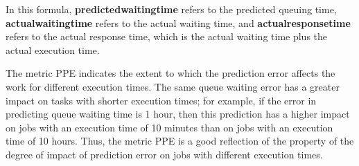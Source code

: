 \documentclass[conference,compsoc]{IEEEtran}
\begin{document}
In this formula, \textbf{predictedwaitingtime} refers to the predicted queuing time, \textbf{actualwaitingtime} refers to the actual waiting time, and \textbf{actualresponsetime} refers to the actual response time, which is the actual waiting time plus the actual execution time.

The metric PPE indicates the extent to which the prediction error affects the work for different execution times. The same queue waiting error has a greater impact on tasks with shorter execution times; for example, if the error in predicting queue waiting time is 1 hour, then this prediction has a higher impact on jobs with an execution time of 10 minutes than on jobs with an execution time of 10 hours. Thus, the metric PPE is a good reflection of the property of the degree of impact of prediction error on jobs with different execution times.
\end{document}
